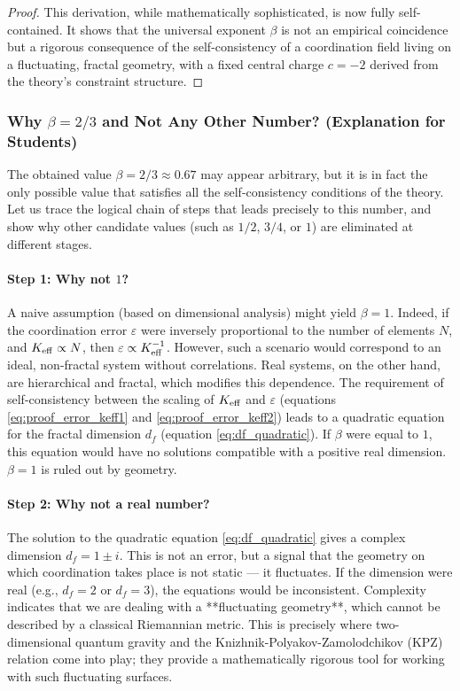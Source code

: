 \documentclass[12pt,a4paper]{article}
\newcommand{\Keff}[1][]{K_{\mathrm{eff}\if\relax\detokenize{#1}\relax\else,#1\fi}}   %
\begin{document}
\begin{proof}
		This derivation, while mathematically sophisticated, is now fully self-contained. It shows that the universal exponent \(\beta\) is not an empirical coincidence but a rigorous consequence of the self-consistency of a coordination field living on a fluctuating, fractal geometry, with a fixed central charge \(c = -2\) derived from the theory's constraint structure.
	\end{proof}
	
	\subsubsection{Why \(\beta = 2/3\) and Not Any Other Number? (Explanation for Students)}
	\label{subsubsec:why-23}
	
	The obtained value \(\beta = 2/3 \approx 0.67\) may appear arbitrary, but it is in fact the only possible value that satisfies all the self-consistency conditions of the theory. Let us trace the logical chain of steps that leads precisely to this number, and show why other candidate values (such as \(1/2\), \(3/4\), or \(1\)) are eliminated at different stages.
	
	\paragraph{Step 1: Why not \(1\)?}
	A naive assumption (based on dimensional analysis) might yield \(\beta = 1\). Indeed, if the coordination error \(\varepsilon\) were inversely proportional to the number of elements \(N\), and \(\Keff \propto N\), then \(\varepsilon \propto \Keff^{-1}\). However, such a scenario would correspond to an ideal, non-fractal system without correlations. Real systems, on the other hand, are hierarchical and fractal, which modifies this dependence. The requirement of self-consistency between the scaling of \(\Keff\) and \(\varepsilon\) (equations \ref{eq:proof_error_keff1} and \ref{eq:proof_error_keff2}) leads to a quadratic equation for the fractal dimension \(d_f\) (equation \ref{eq:df_quadratic}). If \(\beta\) were equal to \(1\), this equation would have no solutions compatible with a positive real dimension. \(\beta = 1\) is ruled out by geometry.
	
	\paragraph{Step 2: Why not a real number?}
	The solution to the quadratic equation \ref{eq:df_quadratic} gives a complex dimension \(d_f = 1 \pm i\). This is not an error, but a signal that the geometry on which coordination takes place is not static — it fluctuates. If the dimension were real (e.g., \(d_f = 2\) or \(d_f = 3\)), the equations would be inconsistent. Complexity indicates that we are dealing with a **fluctuating geometry**, which cannot be described by a classical Riemannian metric. This is precisely where two-dimensional quantum gravity and the Knizhnik-Polyakov-Zamolodchikov (KPZ) relation come into play; they provide a mathematically rigorous tool for working with such fluctuating surfaces.
	
\end{document}
